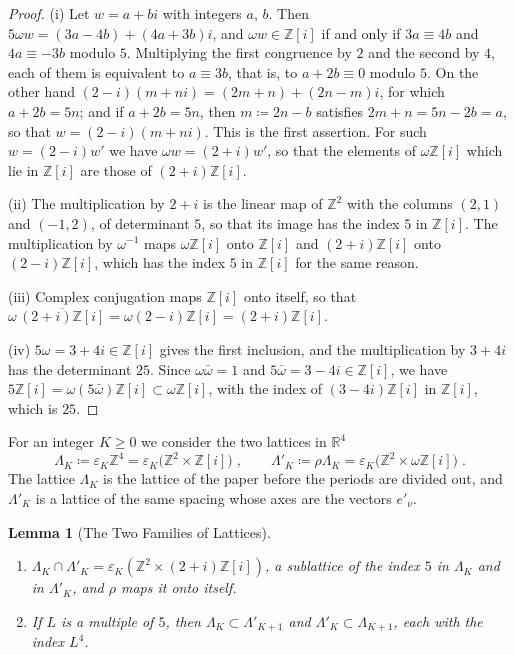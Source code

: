 \documentclass[11pt]{preprint}
\numberwithin{equation}{section}
\newtheorem{lemma}[theorem]{Lemma}
\theoremstyle{definition}
\theoremstyle{remark}
\theoremstyle{plain}
\begin{document}
\begin{proof}
(i) Let $w = a + bi$ with integers $a$, $b$. Then $5\omega w = (3a - 4b) + (4a + 3b)i$, and $\omega w \in \mathbb Z[i]$ if and only if $3a \equiv 4b$ and $4a \equiv -3b$ modulo $5$. Multiplying the first congruence by $2$ and the second by $4$, each of them is equivalent to $a \equiv 3b$, that is, to $a + 2b \equiv 0$ modulo $5$. On the other hand $(2 - i)(m + ni) = (2m + n) + (2n - m)i$, for which $a + 2b = 5n$; and if $a + 2b = 5n$, then $m \coloneqq 2n - b$ satisfies $2m + n = 5n - 2b = a$, so that $w = (2 - i)(m + ni)$. This is the first assertion. For such $w = (2 - i)w'$ we have $\omega w = (2 + i)w'$, so that the elements of $\omega\mathbb Z[i]$ which lie in $\mathbb Z[i]$ are those of $(2 + i)\mathbb Z[i]$.

(ii) The multiplication by $2 + i$ is the linear map of $\mathbb Z^2$ with the columns $(2, 1)$ and $(-1, 2)$, of determinant $5$, so that its image has the index $5$ in $\mathbb Z[i]$. The multiplication by $\omega^{-1}$ maps $\omega\mathbb Z[i]$ onto $\mathbb Z[i]$ and $(2 + i)\mathbb Z[i]$ onto $(2 - i)\mathbb Z[i]$, which has the index $5$ in $\mathbb Z[i]$ for the same reason.

(iii) Complex conjugation maps $\mathbb Z[i]$ onto itself, so that $\omega\,\overline{(2 + i)\mathbb Z[i]} = \omega(2 - i)\mathbb Z[i] = (2 + i)\mathbb Z[i]$.

(iv) $5\omega = 3 + 4i \in \mathbb Z[i]$ gives the first inclusion, and the multiplication by $3 + 4i$ has the determinant $25$. Since $\omega\bar\omega = 1$ and $5\bar\omega = 3 - 4i \in \mathbb Z[i]$, we have $5\mathbb Z[i] = \omega(5\bar\omega)\mathbb Z[i] \subset \omega\mathbb Z[i]$, with the index of $(3 - 4i)\mathbb Z[i]$ in $\mathbb Z[i]$, which is $25$.
\end{proof}

For an integer $K \geq 0$ we consider the two lattices in $\mathbb R^4$
\begin{equation}\label{eq:lattices}
    \Lambda_K \coloneqq \varepsilon_K\mathbb Z^4 = \varepsilon_K\bigl(\mathbb Z^2 \times \mathbb Z[i]\bigr)\;,
    \qquad
    \Lambda'_K \coloneqq \rho\Lambda_K = \varepsilon_K\bigl(\mathbb Z^2 \times \omega\mathbb Z[i]\bigr)\;.
\end{equation}
The lattice $\Lambda_K$ is the lattice of the paper before the periods are divided out, and $\Lambda'_K$ is a lattice of the same spacing whose axes are the vectors $e'_\nu$.

\begin{lemma}[The Two Families of Lattices]\label{lem:lattices}
\begin{enumerate}[label=(\roman*)]
\item $\Lambda_K \cap \Lambda'_K = \varepsilon_K(\mathbb Z^2 \times (2 + i)\mathbb Z[i])$, a sublattice of the index $5$ in $\Lambda_K$ and in $\Lambda'_K$, and $\rho$ maps it onto itself.
\item If $L$ is a multiple of $5$, then $\Lambda_K \subset \Lambda'_{K+1}$ and $\Lambda'_K \subset \Lambda_{K+1}$, each with the index $L^4$.
\end{enumerate}
\end{lemma}
\end{document}
